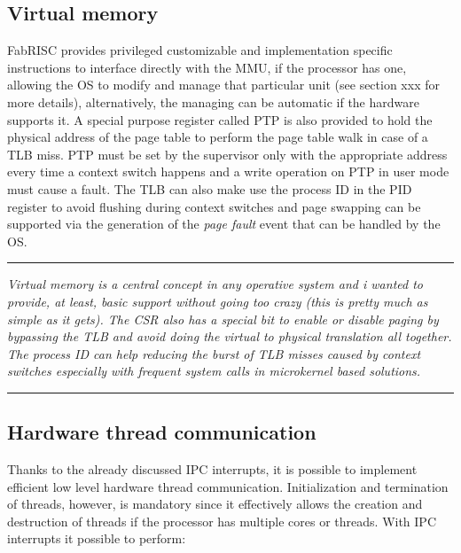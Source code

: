     \subsection{Virtual memory}

        \vspace{10pt}

        FabRISC provides privileged customizable and implementation specific instructions to interface directly with the MMU, if the processor has one, allowing the OS to modify and manage that particular unit (see section xxx for more details), alternatively, the managing can be automatic if the hardware supports it. A special purpose register called PTP is also provided to hold the physical address of the page table to perform the page table walk in case of a TLB miss. PTP must be set by the supervisor only with the appropriate address every time a context switch happens and a write operation on PTP in user mode must cause a fault. The TLB can also make use the process ID in the PID register to avoid flushing during context switches and page swapping can be supported via the generation of the \textit{page fault} event that can be handled by the OS.

    \par\noindent\rule{\textwidth}{0.4pt}
    \textit{Virtual memory is a central concept in any operative system and i wanted to provide, at least, basic support without going too crazy (this is pretty much as simple as it gets). The CSR also has a special bit to enable or disable paging by bypassing the TLB and avoid doing the virtual to physical translation all together. The process ID can help reducing the burst of TLB misses caused by context switches especially with frequent system calls in microkernel based solutions.}
        \par\noindent\rule{\textwidth}{0.4pt}

    \subsection{Hardware thread communication}

        \vspace{10pt}

        Thanks to the already discussed IPC interrupts, it is possible to implement efficient low level hardware thread communication. Initialization and termination of threads, however, is mandatory since it effectively allows the creation and destruction of threads if the processor has multiple cores or threads. With IPC interrupts it possible to perform:

